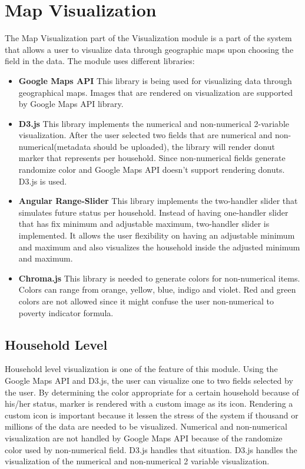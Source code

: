 \section{Map Visualization}
The Map Visualization part of the Visualization module is a part of the system that allows a user to visualize data through geographic maps upon choosing the field in the data. The module uses different libraries: 
\begin{itemize}
	\item \textbf{Google Maps API}
	This library is being used for visualizing data through geographical maps. Images that are rendered on visualization are supported by Google Maps API library. 
	\item \textbf{D3.js}
	This library implements the numerical and non-numerical 2-variable visualization. After the user selected two fields that are numerical and non-numerical(metadata should be uploaded), the library will render donut marker that represents per household. Since non-numerical fields generate randomize color and Google Maps API doesn't support rendering donuts. D3.js is used. 
	
	\item \textbf{Angular Range-Slider}
	This library implements the two-handler slider that simulates future status per household. Instead of having one-handler slider that has fix minimum and adjustable maximum, two-handler slider is implemented. It allows the user flexibility on having an adjustable minimum and maximum and also visualizes the household inside the adjusted minimum and maximum. 
	
	\item \textbf{Chroma.js}
	This library is needed to generate colors for non-numerical items. Colors can range from orange, yellow, blue, indigo and violet. Red and green colors are not allowed since it might confuse the user non-numerical to poverty indicator formula.
\end{itemize}
\subsection{Household Level}
Household level visualization is one of the feature of this module. Using the Google Maps API and D3.js, the user can visualize one to two fields selected by the user. By determining the color appropriate for a certain household because of his/her status, marker is rendered with a custom image as its icon. Rendering a custom icon is important because it lessen the stress of the system if thousand or millions of the data are needed to be visualized. Numerical and non-numerical visualization are not handled by Google Maps API because of the randomize color used by non-numerical field. D3.js handles that situation. D3.js handles the visualization of the numerical and non-numerical 2 variable visualization.

